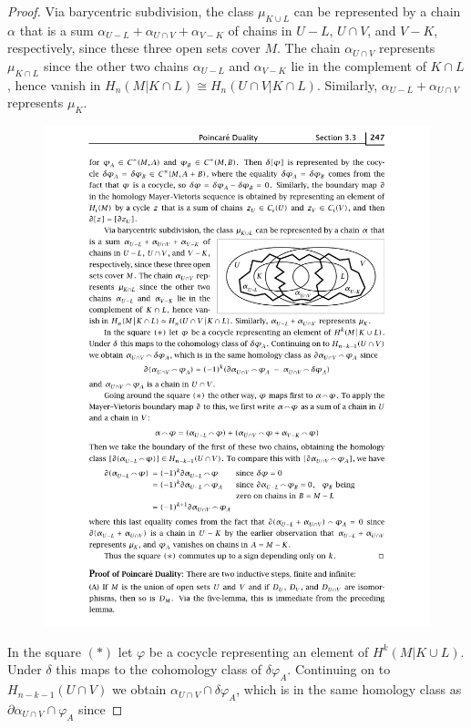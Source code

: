 \begin{proof}
Via barycentric subdivision, the class $\mu_{K\cup L}$ can be represented by a chain $\alpha$ that is a sum $\alpha_{U-L}+\alpha_{U\cap V}+\alpha_{V-K}$ of
chains in $U-L$, $U\cap V$, and $V-K$, respectively, since these three open
sets cover $M$. The chain $\alpha_{U\cap V}$ represents $\mu_{K\cap L}$ since the other two chains $\alpha_{U-L}$ and $\alpha_{V-K}$ lie in the
complement of $K\cap L$, hence vanish in $H_n(M|K\cap L)\cong H_n(U\cap V|K\cap L)$. Similarly, $\alpha_{U-L}+\alpha_{U\cap V}$ represents $\mu_K$.\par
\begin{figure}[htbp]
\centering
\includegraphics{Duality}
\end{figure}
In the square $(*) $ let $\varphi$ be a cocycle representing an element of $H^k(M|K\cup L)$. Under $\delta$ this maps to the cohomology class of $\delta\varphi_A$. Continuing on to $H_{n-k-1}(U\cap V)$ we obtain $\alpha_{U\cap V}\cap\delta\varphi_A$, which is in the same homology class as $\partial\alpha_{U\cap V}\cap\varphi_A$ since

\end{proof}
